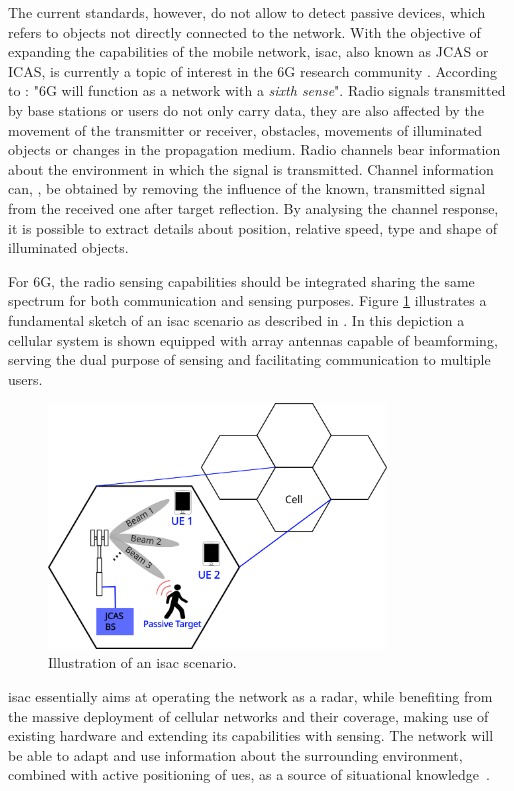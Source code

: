 The current standards, however, do not allow to detect passive devices, which refers to objects not directly connected to the network.
With the objective of expanding the capabilities of the mobile network, \gls{isac}, also known as JCAS or ICAS, is currently a topic of interest in the 6G research community \cite{Mandelli_Henninger_Bauhofer_Wild_2023}.
According to \cite{Viswanathan_Wild_2021}: "6G will function as a network with a \textit{sixth sense}". Radio signals transmitted by base stations or users do not only carry data, they are also affected by the movement of the transmitter or receiver, obstacles, movements of illuminated objects or changes in the propagation medium. Radio channels bear information about the environment in which the signal is transmitted. 
Channel information can, \eg, be obtained by removing the influence of the known, transmitted signal from the received one after target reflection. By analysing the channel response, it is possible to extract details about position, relative speed, type and shape of illuminated objects.

For 6G, the radio sensing capabilities should be integrated sharing the same spectrum for both communication and sensing purposes. Figure \ref{fig:isac-scheme-1} illustrates a fundamental sketch of an \gls{isac} scenario as described in \cite{Wild_Grudnitsky_Mandelli_Henninger_Guan_Schaich_2023}. In this depiction a cellular system is shown equipped with array antennas capable of beamforming, serving the dual purpose of sensing and facilitating communication to multiple users.
\begin{figure}[t]
	\centering
	\includegraphics[width=0.8\textwidth]{Images/introduction/isac-scheme-1.png}
	\caption{\small Illustration of an \gls{isac} scenario.}
	\label{fig:isac-scheme-1}
\end{figure}
\Gls{isac} essentially aims at operating the network as a radar, while benefiting from the massive deployment of cellular networks and their coverage, making use of existing hardware and extending its capabilities with sensing.
The network will be able to adapt and use information about the surrounding environment, combined with active positioning of \glspl{ue}, as a source of situational knowledge~\cite{Viswanathan_communications_6G_era}.



